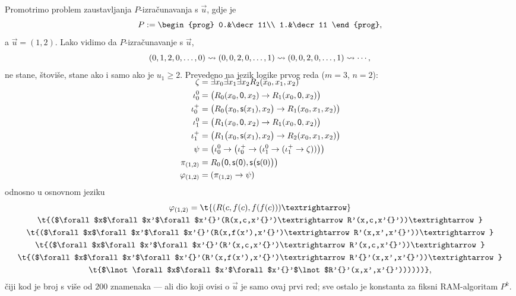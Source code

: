 \begin{primjer}[{name=[zaustavljanje RAM-izračunavanja kao valjanost jedne formule]}]
Promotrimo problem zaustavljanja $P$-izračunavanja s $\vec u$, gdje je
\begin{equation}
    P:=\begin{prog}
    0.&\decr11\\
    1.&\decr11
    \end{prog}\text,
\end{equation}
a $\vec u=(1,2)$. Lako vidimo da $P$-izračunavanje s $\vec u$,
\begin{equation}
    (0,1,2,0,\dotsc,0)\leadsto(0,0,2,0,\dotsc,1)\leadsto(0,0,2,0,\dotsc,1)\leadsto\dotsb\text,
\end{equation}
ne stane, štoviše, stane ako i samo ako je $u_1\ge2$. Prevedeno na jezik logike prvog reda ($m=3$, $n=2$):
\begin{align}
\SwapAboveDisplaySkip
    \zeta&=\exists x_0\exists x_1\exists x_2 R_2(x_0,x_1,x_2)\\
    \iota_0^0&=\bigl(R_0(x_0,\mathsf0,x_2)\to R_1(x_0,\mathsf0,x_2)\bigr)\\
    \iota_0^+&=\bigl(R_0\bigl(x_0,\mathsf s(x_1),x_2\bigr)\to R_1(x_0,x_1,x_2)\bigr)\\
    \iota_1^0&=\bigl(R_1(x_0,\mathsf0,x_2)\to R_1(x_0,\mathsf0,x_2)\bigr)\\
    \iota_1^+&=\bigl(R_1\bigl(x_0,\mathsf s(x_1),x_2\bigr)\to R_2(x_0,x_1,x_2)\bigr)\\
    \psi&=\bigl(\iota_0^0\to\bigl(\iota_0^+\to(\iota_1^0\to(\iota_1^+\to\zeta))\bigl)\bigl)\\
    \pi_{(1,2)}&=R_0\bigl(\mathsf0,\mathsf s(\mathsf0),\mathsf s\bigl(\mathsf s(0)\bigr)\bigr)\\
    \varphi_{(1,2)}&=(\pi_{(1,2)}\to\psi)
\end{align}
odnosno u osnovnom jeziku
\begin{multline}
    \varphi_{(1,2)}=\t{(R(c,f(c),f(f(c)))\textrightarrow}\\
    \t{($\forall$x$\forall$x'$\forall$x'{}'(R(x,c,x'{}')\textrightarrow R'(x,c,x'{}'))\textrightarrow}\\
    \t{($\forall$x$\forall$x'$\forall$x'{}'(R(x,f(x'),x'{}')\textrightarrow R'(x,x',x'{}'))\textrightarrow}\\
    \t{($\forall$x$\forall$x'$\forall$x'{}'(R'(x,c,x'{}')\textrightarrow R'(x,c,x'{}'))\textrightarrow}\\
    \t{($\forall$x$\forall$x'$\forall$x'{}'(R'(x,f(x'),x'{}')\textrightarrow R'{}'(x,x',x'{}'))\textrightarrow}\\
    \t{$\lnot\forall$x$\forall$x'$\forall$x'{}'$\lnot$R'{}'(x,x',x'{}'))))))}\text,
\end{multline}
čiji kod je broj s više od $200$ znamenaka --- ali dio koji ovisi o $\vec u$ je samo ovaj prvi red; sve ostalo je konstanta za fiksni RAM-algoritam $P^k$.
\end{primjer}

